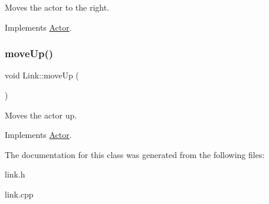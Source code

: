 Moves the actor to the right. 



Implements \mbox{\hyperlink{classActor_a9176d8f8ec68fcbd91c48223e7c65775}{Actor}}.

\mbox{\label{classLink_a850a1e6c7a68d921b36d30dc918a7668}} 
\subsubsection{\texorpdfstring{moveUp()}{moveUp()}}
{\footnotesize\ttfamily void Link\+::move\+Up (\begin{DoxyParamCaption}{ }\end{DoxyParamCaption})\hspace{0.3cm}{\ttfamily [virtual]}}



Moves the actor up. 



Implements \mbox{\hyperlink{classActor_afaa299f90233461ee4df96dcfda3008a}{Actor}}.



The documentation for this class was generated from the following files\+:\begin{DoxyCompactItemize}
\item 
link.\+h\item 
link.\+cpp\end{DoxyCompactItemize}
